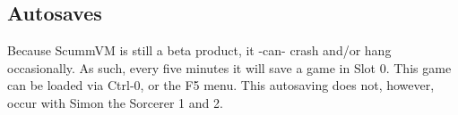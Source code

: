 \subsection {Autosaves}
Because ScummVM is still a beta product, it -can- crash and/or hang
occasionally. As such, every five minutes it will save a game in Slot 0. This
game can be loaded via Ctrl-0, or the F5 menu. This autosaving does not, 
however, occur with Simon the Sorcerer 1 and 2.
